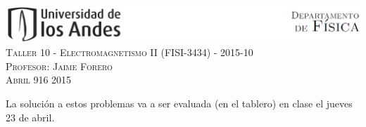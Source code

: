 \documentclass[letterpaper,10pt,onecolumn]{article}
\begin{document}
\begin{center}

\includegraphics[width=490pt]{header.png}\\[0.5cm]

\textsc{\LARGE Taller 10 - Electromagnetismo II (FISI-3434) - 2015-10}\\[0.5cm]

\textsc{\Large{Profesor: Jaime Forero}} \\[0.5cm]

\textsc{Abril 916 2015} \\[0.5cm]

\end{center}

La soluci\'on a estos problemas va a ser evaluada (en el tablero) en
clase el jueves 23 de abril.
\end{document}
